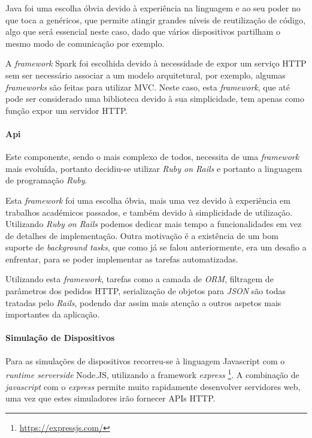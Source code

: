 Java foi uma escolha óbvia devido à experiência na linguagem e ao seu poder no que toca a genéricos, que permite atingir grandes níveis de reutilização de código, algo que será essencial neste caso, dado que vários dispositivos partilham o mesmo modo de comunicação por exemplo.

A \textit{framework} Spark foi escolhida devido à necessidade de expor um serviço HTTP sem ser necessário associar a um modelo arquitetural, por exemplo, algumas \textit{frameworks} são feitas para utilizar MVC. Neste caso, esta \textit{framework}, que até pode ser considerado uma biblioteca devido à sua simplicidade, tem apenas como função expor um servidor HTTP.

\paragraph*{Api}
Este componente, sendo o mais complexo de todos, necessita de uma \textit{framework} mais evoluída, portanto decidiu-se utilizar \textit{Ruby on Rails} e portanto a linguagem de programação \textit{Ruby}.

Esta \textit{framework} foi uma escolha óbvia, mais uma vez devido à experiência em trabalhos académicos passados, e também devido à simplicidade de utilização. Utilizando \textit{Ruby on Rails} podemos dedicar mais tempo a funcionalidades em vez de detalhes de implementação. Outra motivação é a existência de um bom suporte de \textit{background tasks}, que como já se falou anteriormente, era um desafio a enfrentar, para se poder implementar as tarefas automatizadas.

Utilizando esta \textit{framework}, tarefas como a camada de \textit{ORM}, filtragem de parâmetros dos pedidos HTTP, serialização de objetos para \textit{JSON} são todas tratadas pelo \textit{Rails}, podendo dar assim mais atenção a outros aspetos mais importantes da aplicação.

\paragraph*{Simulação de Dispositivos}

Para as simulações de dispositivos recorreu-se à linguagem Javascript com o \textit{runtime serverside} Node.JS, utilizando a framework \textit{express} \footnote{\url{https://expressjs.com/}}. A combinação de \textit{javascript} com o \textit{express} permite muito rapidamente desenvolver servidores web, uma vez que estes simuladores irão fornecer APIs HTTP.

